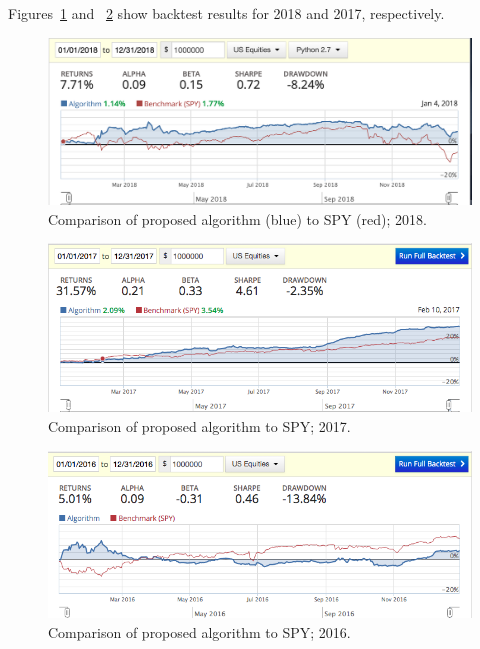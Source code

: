 \documentclass{article}
\begin{document}
\begin{case}
Figures~\ref{fig:backtest-2018} and ~\ref{fig:backtest-2017} show
backtest results for 2018 and 2017, respectively.

\begin{figure}\label{fig:backtest-2018}
\includegraphics[bb=0 0 640 480]{figures/mad_mfd_macd_2018.png}
\caption{Comparison of proposed algorithm (blue) to SPY (red); 2018.}  
\end{figure}

\begin{figure}\label{fig:backtest-2017}
\includegraphics[bb=0 0 640 480]{figures/mad_mfd_macd_2017.png}
\caption{Comparison of proposed algorithm to SPY; 2017.}  
\end{figure}

\begin{figure}\label{fig:backtest-2016}
\includegraphics[bb=0 0 640 480]{figures/mad_mfd_macd_2016.png}
\caption{Comparison of proposed algorithm to SPY; 2016.}  
\end{figure}


\end{case}
\end{document}
